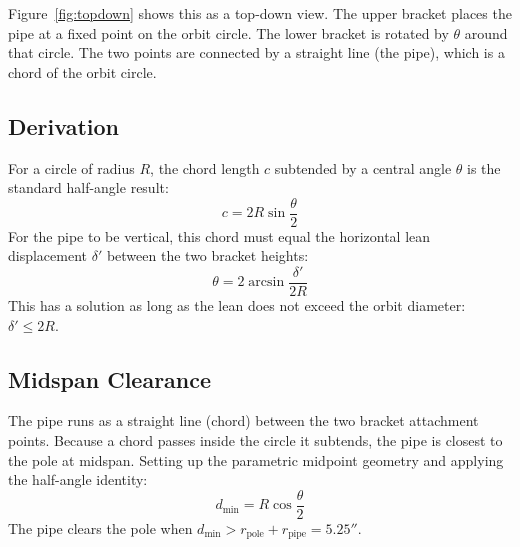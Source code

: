 \documentclass[11pt,twocolumn]{article}
\begin{document}
Figure~\ref{fig:topdown} shows this as a top-down view. The upper bracket
places the pipe at a fixed point on the orbit circle. The lower bracket is
rotated by $\theta$ around that circle. The two points are connected by a
straight line (the pipe), which is a chord of the orbit circle.

\subsection{Derivation}

For a circle of radius $R$, the chord length $c$ subtended by a central angle
$\theta$ is the standard half-angle result:
%
\begin{equation}
  c = 2R\sin\frac{\theta}{2}
  \label{eq:chord}
\end{equation}
%
For the pipe to be vertical, this chord must equal the horizontal lean
displacement $\delta'$ between the two bracket heights:
%
\begin{equation}
  \theta = 2\arcsin\frac{\delta'}{2R}
  \label{eq:theta}
\end{equation}
%
This has a solution as long as the lean does not exceed the orbit diameter:
$\delta' \leq 2R$.

\subsection{Midspan Clearance}

The pipe runs as a straight line (chord) between the two bracket attachment
points. Because a chord passes inside the circle it subtends, the pipe is
closest to the pole at midspan. Setting up the parametric midpoint geometry
and applying the half-angle identity:
%
\begin{equation}
  d_\text{min} = R\cos\frac{\theta}{2}
  \label{eq:clearance}
\end{equation}
%
The pipe clears the pole when $d_\text{min} > r_\text{pole} + r_\text{pipe}
= 5.25''$.
\end{document}

